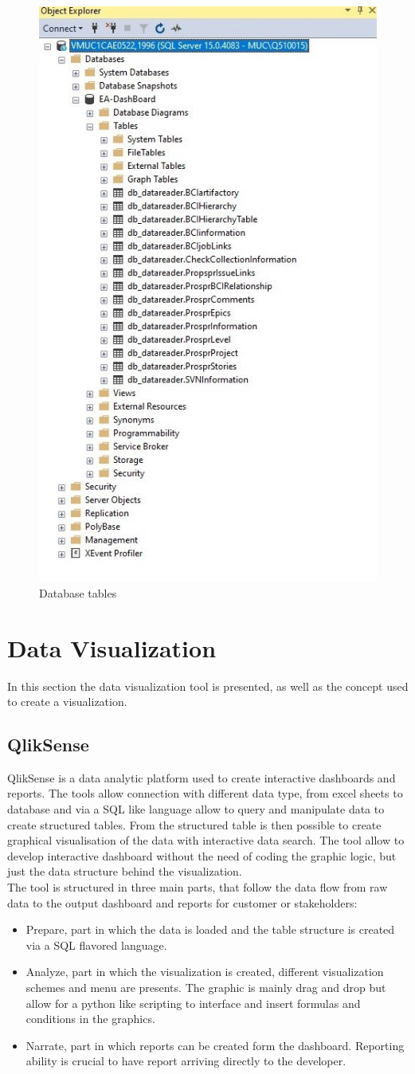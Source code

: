 \documentclass[../main.tex]{subfiles}
\begin{document}
\begin{figure}[H]
    \centering
    \includegraphics[width=0.5\linewidth]{images_folder/databasetable.jpg}
    \caption{Database tables}
    \label{fig:dbtables}
\end{figure} 

\section{Data Visualization}
In this section the data visualization tool is presented, as well as the concept used to create a visualization. 
\subsection{QlikSense}
QlikSense is a data analytic platform used to create interactive dashboards and reports. The tools allow connection with different data type, from excel sheets to database and via a SQL like language allow to query and manipulate data to create structured tables. From the structured table is then possible to create graphical visualisation of the data with interactive data search. The tool allow to develop interactive dashboard without the need of coding the graphic logic, but just the data structure behind the visualization.\\
The tool is structured in three main parts, that follow the data flow from raw data to the output dashboard and reports for customer or stakeholders:
\begin{itemize}
    \item Prepare, part in which the data is loaded and the table structure is created via a SQL flavored language. 
    \item Analyze, part in which the visualization is created, different visualization schemes and menu are presents. The graphic is mainly drag and drop but allow for a python like scripting to interface and insert formulas and conditions in the graphics.
    \item Narrate, part in which reports can be created form the dashboard. Reporting ability is crucial to have report arriving directly to the developer.  
\end{itemize}
\end{document}
